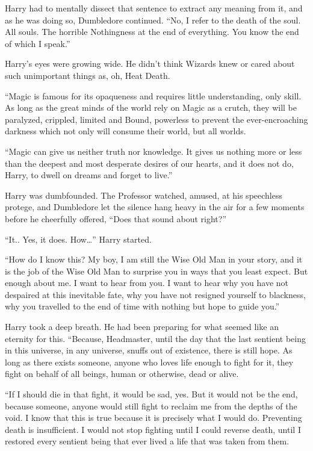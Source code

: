 Harry had to mentally dissect that sentence to extract any meaning from it, and as he was doing so, Dumbledore continued. “No, I refer to the death of the soul. All souls. The horrible Nothingness at the end of everything. You know the end of which I speak.”

Harry’s eyes were growing wide. He didn’t think Wizards knew or cared about such unimportant things as, oh, Heat Death.

“Magic is famous for its opaqueness and requires little understanding, only skill. As long as the great minds of the world rely on Magic as a crutch, they will be paralyzed, crippled, limited and Bound, powerless to prevent the ever-encroaching darkness which not only will consume their world, but all worlds.

“Magic can give us neither truth nor knowledge. It gives us nothing more or less than the deepest and most desperate desires of our hearts, and it does not do, Harry, to dwell on dreams and forget to live.”

Harry was dumbfounded. The Professor watched, amused, at his speechless protege, and Dumbledore let the silence hang heavy in the air for a few moments before he cheerfully offered, “Does that sound about right?”

“It.. Yes, it does. How…” Harry started.

“How do I know this? My boy, I am still the Wise Old Man in your story, and it is the job of the Wise Old Man to surprise you in ways that you least expect. But enough about me. I want to hear from you. I want to hear why you have not despaired at this inevitable fate, why you have not resigned yourself to blackness, why you travelled to the end of time with nothing but hope to guide you.”

Harry took a deep breath. He had been preparing for what seemed like an eternity for this. “Because, Headmaster, until the day that the last sentient being in this universe, in any universe, snuffs out of existence, there is still hope. As long as there exists someone, anyone who loves life enough to fight for it, they fight on behalf of all beings, human or otherwise, dead or alive.

“If I should die in that fight, it would be sad, yes. But it would not be the end, because someone, anyone would still fight to reclaim me from the depths of the void. I know that this is true because it is precisely what I would do. Preventing death is insufficient. I would not stop fighting until I could reverse death, until I restored every sentient being that ever lived a life that was taken from them.

